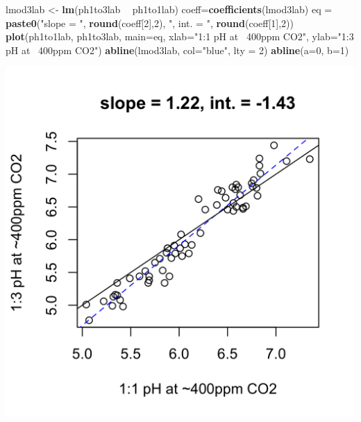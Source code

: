 \documentclass[]{article}
\newenvironment{Shaded}{\begin{snugshade}}{\end{snugshade}}
\newcommand{\DataTypeTok}[1]{\textcolor[rgb]{0.13,0.29,0.53}{#1}}
\newcommand{\DecValTok}[1]{\textcolor[rgb]{0.00,0.00,0.81}{#1}}
\newcommand{\KeywordTok}[1]{\textcolor[rgb]{0.13,0.29,0.53}{\textbf{#1}}}
\newcommand{\NormalTok}[1]{#1}
\newcommand{\OperatorTok}[1]{\textcolor[rgb]{0.81,0.36,0.00}{\textbf{#1}}}
\newcommand{\StringTok}[1]{\textcolor[rgb]{0.31,0.60,0.02}{#1}}
\begin{document}
\begin{Shaded}
\begin{Highlighting}[]
\NormalTok{lmod3lab <-}\StringTok{ }\KeywordTok{lm}\NormalTok{(ph1to3lab }\OperatorTok{~}\StringTok{ }\NormalTok{ph1to1lab)}
\NormalTok{coeff=}\KeywordTok{coefficients}\NormalTok{(lmod3lab)}
\NormalTok{eq =}\StringTok{ }\KeywordTok{paste0}\NormalTok{(}\StringTok{"slope = "}\NormalTok{, }\KeywordTok{round}\NormalTok{(coeff[}\DecValTok{2}\NormalTok{],}\DecValTok{2}\NormalTok{), }\StringTok{", int. = "}\NormalTok{, }\KeywordTok{round}\NormalTok{(coeff[}\DecValTok{1}\NormalTok{],}\DecValTok{2}\NormalTok{))}
\KeywordTok{plot}\NormalTok{(ph1to1lab, ph1to3lab, }\DataTypeTok{main=}\NormalTok{eq,}
   \DataTypeTok{xlab=}\StringTok{"1:1 pH at ~400ppm CO2"}\NormalTok{, }\DataTypeTok{ylab=}\StringTok{"1:3 pH at ~400ppm CO2"}\NormalTok{)}
\KeywordTok{abline}\NormalTok{(lmod3lab, }\DataTypeTok{col=}\StringTok{"blue"}\NormalTok{, }\DataTypeTok{lty =} \DecValTok{2}\NormalTok{)}
\KeywordTok{abline}\NormalTok{(}\DataTypeTok{a=}\DecValTok{0}\NormalTok{, }\DataTypeTok{b=}\DecValTok{1}\NormalTok{)}
\end{Highlighting}
\end{Shaded}

\includegraphics{output-rmd/whitman-figure-request-3-lab-wisc-1.png}
\end{document}
